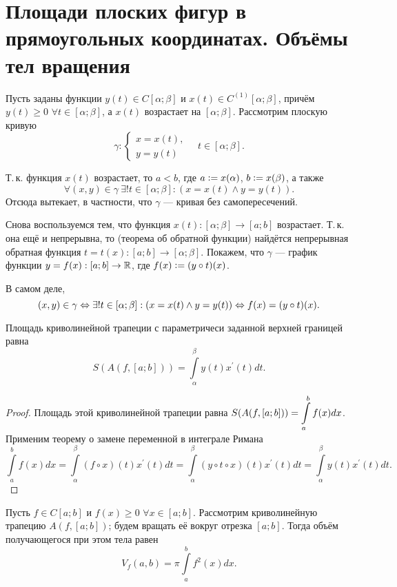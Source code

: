 \section{Площади плоских фигур в прямоугольных координатах. Объёмы тел вращения}

Пусть заданы функции $y(t) \in C[\alpha; \beta]$ и $x(t) \in C^{(1)}[\alpha; \beta]$, причём $y(t) \geqslant 0$ $\forall t \in [\alpha; \beta]$, а $x(t)$ возрастает на $[\alpha; \beta]$. Рассмотрим плоскую кривую
\[
    \gamma:
    \begin{cases}
        x = x(t),\\
        y = y(t)
    \end{cases}\quad t \in [\alpha; \beta].
\]

Т.\,к. функция $x(t)$ возрастает, то $a < b$, где $a \vcentcolon = x(\alpha)$, $b \vcentcolon = x(\beta)$, а также
\[
    \forall (x, y) \in \gamma\ \exists ! t \in [\alpha; \beta]: (x = x(t) \wedge y = y(t)).
\]
Отсюда вытекает, в частности, что $\gamma$ --- кривая без самопересечений.

Снова воспользуемся тем, что функция $x(t): [\alpha; \beta] \to [a; b]$ возрастает. Т.\,к. она ещё и непрерывна, то (теорема об обратной функции) найдётся непрерывная обратная функция $t = t(x): [a; b] \to [\alpha; \beta]$. Покажем, что $\gamma$ --- график функции $y = f(x): [a; b] \to \mathbb{R}$, где $f(x) \vcentcolon = (y \circ t)(x)$.

В самом деле,
\[
    (x, y) \in \gamma \Leftrightarrow \exists ! t \in [\alpha; \beta]: \left(x = x(t) \wedge y = y(t)\right) \Leftrightarrow f(x) = (y \circ t)(x).
\]

\begin{theorem}
    Площадь криволинейной трапеции с параметричеси заданной верхней границей равна
    \[
        S(A(f, [a; b])) = \int\limits_\alpha^\beta y(t)x^\prime(t)dt.
    \]
\end{theorem}

\begin{proof}
    Площадь этой криволинейной трапеции равна $\displaystyle S(A(f, [a; b])) = \int\limits_a^bf(x)dx$. Применим теорему о замене переменной в интеграле Римана
    \[
        \int\limits_a^bf(x)dx = \int\limits_\alpha^\beta(f \circ x)(t)x^\prime(t)dt = \int\limits_\alpha^\beta(y \circ t \circ x)(t)x^\prime(t)dt = \int\limits_\alpha^\beta y(t)x^\prime(t)dt.
    \]
\end{proof}

\begin{theorem}
    Пусть $f \in C[a; b]$ и $f(x) \geqslant 0$ $\forall x \in [a; b]$. Рассмотрим криволинейную трапецию $A(f, [a; b])$; будем вращать её вокруг отрезка $[a; b]$. Тогда объём получающегося при этом тела равен
    \[
        V_f(a, b) = \pi\int\limits_a^bf^2(x)dx.
    \]
\end{theorem}

